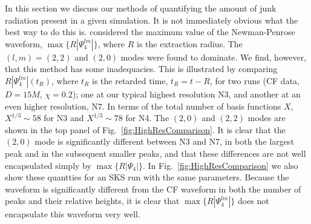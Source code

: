 In this section we discuss our methods of
quantifying the amount of junk radiation present in a given
simulation. It is not immediately obvious what the best way to do this
is.  \cite{Lovelace2009} considered the
maximum value of the Newman-Penrose waveform,
$\max\{R|\Psi_4^{lm}|\}$, where $R$ is the extraction radius.  The
  $(l,m)=(2,2)$ and $(2,0)$ modes were found to dominate. We find,
  however, that this method has some inadequacies. This is illustrated
  by comparing $R|\Psi_4^{lm}|(t_R)$, where $t_R$ is the retarded time,
  $t_R=t-R$, for two runs (CF data, $D=15M$, $\chi=0.2$); one at our
  typical highest resolution N3, and another at an even higher
  resolution, N7. In terms of the total number of basis
    functions $X$, $X^{1/3}\sim58$ for N3 and $X^{1/3}\sim78$ for
    N4. The $(2,0)$ and $(2,2)$ modes are shown in the top panel of
  Fig.~\ref{fig:HighResComparison}. It is clear that the $(2,0)$ mode
  is significantly different between N3 and N7, in both the
  largest peak and in the subsequent smaller peaks, and that these
  differences are not well encapsulated simply by
  $\max\{R|\Psi_4|\}$. In Fig.~\ref{fig:HighResComparison} we also
  show these quantties for an SKS run with the same parameters. Because
  the waveform is significantly different from the CF waveform in both the
  number of peaks and their relative heights, it is clear that
  $\max\{R|\Psi_4^{lm}|\}$ does not encapsulate this waveform very well.


